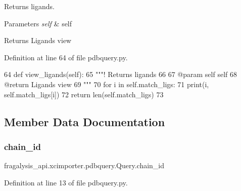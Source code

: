 Returns ligands. 


\begin{DoxyParams}{Parameters}
{\em self} & self \\
\hline
\end{DoxyParams}
\begin{DoxyReturn}{Returns}
Ligands view 
\end{DoxyReturn}


Definition at line 64 of file pdbquery.\+py.


\begin{DoxyCode}
64     \textcolor{keyword}{def }view\_ligands(self):
65         \textcolor{stringliteral}{"""! Returns ligands}
66 \textcolor{stringliteral}{        }
67 \textcolor{stringliteral}{        @param self self}
68 \textcolor{stringliteral}{        @return Ligands view}
69 \textcolor{stringliteral}{        """}
70         \textcolor{keywordflow}{for} i \textcolor{keywordflow}{in} self.match\_ligs:
71             print(i, self.match\_ligs[i])
72         \textcolor{keywordflow}{return} len(self.match\_ligs)
73 
\end{DoxyCode}


\subsection{Member Data Documentation}
\mbox{\label{classfragalysis__api_1_1xcimporter_1_1pdbquery_1_1_query_a79cbf79b07436d26929d7576a5f687da}} 
\subsubsection{\texorpdfstring{chain\+\_\+id}{chain\_id}}
{\footnotesize\ttfamily fragalysis\+\_\+api.\+xcimporter.\+pdbquery.\+Query.\+chain\+\_\+id}



Definition at line 13 of file pdbquery.\+py.

\mbox{\label{classfragalysis__api_1_1xcimporter_1_1pdbquery_1_1_query_a5162fe822deae38446960b3593b17aa5}} 
